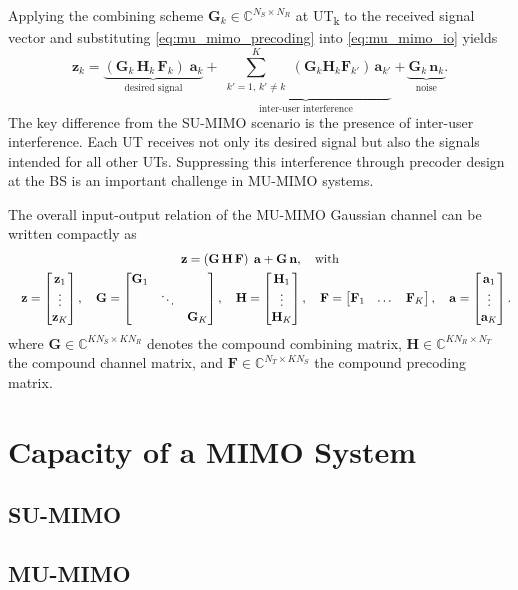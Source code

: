 Applying the combining scheme $\mathbf{G}_k \in \mathbb{C}^{N_S \times N_R}$ at \ac{UT}\textsubscript{k} to the received signal vector and substituting \eqref{eq:mu_mimo_precoding} into \eqref{eq:mu_mimo_io} yields
\begin{equation}
    \mathbf{z}_k 
    = \underbrace{\left(\mathbf{G}_k \, \mathbf{H}_k \, \mathbf{F}_k\right) \; \mathbf{a}_k}_{\text{desired signal}}
    + \underbrace{\sum_{\substack{k'=1, \, k'\neq k}}^{K} \left(\mathbf{G}_k \mathbf{H}_k \mathbf{F}_{k'}\right) \, \mathbf{a}_{k'}}_{\text{inter-user interference}} 
    + \underbrace{\mathbf{G}_k \, \mathbf{n}_k}_{\text{noise}}.
    \label{eq:mu_mimo_effective}
\end{equation}
The key difference from the \ac{SU}-\ac{MIMO} scenario is the presence of inter-user interference. Each \ac{UT} receives not only its desired signal but also the signals intended for all other \acp{UT}. Suppressing this interference through precoder design at the \ac{BS} is an important challenge in \ac{MU}-\ac{MIMO} systems.

The overall input-output relation of the \ac{MU}-\ac{MIMO} Gaussian channel can be written compactly as
\begin{gather}
    \mathbf{z} = \left(\mathbf{G} \, \mathbf{H} \, \mathbf{F}\right) \; \mathbf{a} + \mathbf{G} \, \mathbf{n}, \quad \text{with} \\
    \quad \mathbf{z} = \begin{bmatrix} \mathbf{z}_1 \\ \vdots \\ \mathbf{z}_K \end{bmatrix},
    \quad \mathbf{G} = \begin{bmatrix} \mathbf{G}_1 & & \\ & \ddots & \\ & & \mathbf{G}_K \end{bmatrix},
    \quad \mathbf{H} = \begin{bmatrix} \mathbf{H}_1 \\ \vdots \\ \mathbf{H}_K \end{bmatrix}, 
    \quad \mathbf{F} = \begin{bmatrix} \mathbf{F}_1 & \dots & \mathbf{F}_K \end{bmatrix}, 
    \quad \mathbf{a} = \begin{bmatrix} \mathbf{a}_1 \\ \vdots \\ \mathbf{a}_K \end{bmatrix}. \notag
\end{gather}
where $\mathbf{G} \in \mathbb{C}^{K N_S \times K N_R}$ denotes the compound combining matrix, $\mathbf{H} \in \mathbb{C}^{K N_R \times N_T}$ the compound channel matrix, and $\mathbf{F} \in \mathbb{C}^{N_T \times K N_S}$ the compound precoding matrix.

\section{Capacity of a MIMO System}

\subsection{SU-MIMO}

\subsection{MU-MIMO}

